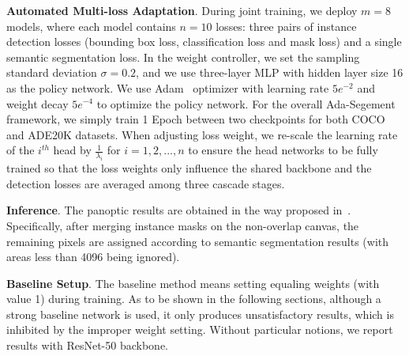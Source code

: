 \documentclass[letterpaper]{article} \usepackage{aaai21}  \usepackage{times}  \usepackage{helvet} \usepackage{courier}  \usepackage[hyphens]{url}  \usepackage{graphicx} \urlstyle{rm} \def\UrlFont{\rm}  \usepackage{natbib}  \usepackage{caption} \frenchspacing  \setlength{\pdfpagewidth}{8.5in}  \setlength{\pdfpageheight}{11in}
\begin{document}
 \noindent
 \textbf{Automated Multi-loss Adaptation}. 
 During joint training, we deploy $m=8$ models, where each model contains $n=10$ losses:
 three pairs of instance detection losses (bounding box loss, classification
 loss and mask loss) and a single semantic segmentation loss.
 In the weight controller, we set the sampling standard deviation $\sigma=0.2$,
 and we use three-layer MLP with hidden 
 layer size 16 as the policy network. We use Adam~\cite{kingma2014adam} optimizer with learning rate 
 $5e^{-2}$ and weight decay $5e^{-4}$ to optimize the policy network. 
 For the overall Ada-Segement framework, we simply train 1 Epoch between two checkpoints for both COCO 
 and ADE20K datasets. When adjusting loss weight, we re-scale the learning rate of the $i^{th}$ head by $\frac{1}{\lambda_{i}}$ 
 for $i=1,2,...,n$ to ensure the head networks to be fully trained so that the loss weights only
 influence the shared backbone and the detection losses are averaged among three cascade stages.  
 
 \noindent
 \textbf{Inference}. The panoptic results are obtained 
 in the way proposed in~\cite{panoptic_segmentation}.
Specifically, after merging instance masks on the non-overlap canvas, the remaining pixels
 are assigned according to semantic segmentation results (with areas less than 4096 being ignored). 
 
 \noindent
 \textbf{Baseline Setup}. The baseline method means 
setting equaling weights (with value 1) during training. 
 As to be shown in the following sections, although a strong baseline network is used, 
 it only produces unsatisfactory results, which is inhibited by the improper weight setting.
 Without particular notions, we report results with ResNet-50 backbone.
\end{document}
